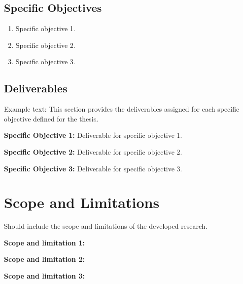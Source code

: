 \subsection{Specific Objectives}
\label{section:specific-objectives}

\begin{enumerate}
	\item Specific objective 1.
	
	\item Specific objective 2.
	
	\item Specific objective 3.
	
\end{enumerate}

\subsection{Deliverables}
Example text:
This section provides the deliverables assigned for each specific objective defined for the thesis.

\textbf{Specific Objective 1:}
Deliverable for specific objective 1. 

\textbf{Specific Objective 2:}
Deliverable for specific objective 2.

\textbf{Specific Objective 3:}
Deliverable for specific objective 3.

\section{Scope and Limitations}

Should include the scope and limitations of the developed research.

\textbf{Scope and limitation 1:} 

\textbf{Scope and limitation 2:}
 
\textbf{Scope and limitation 3:} 